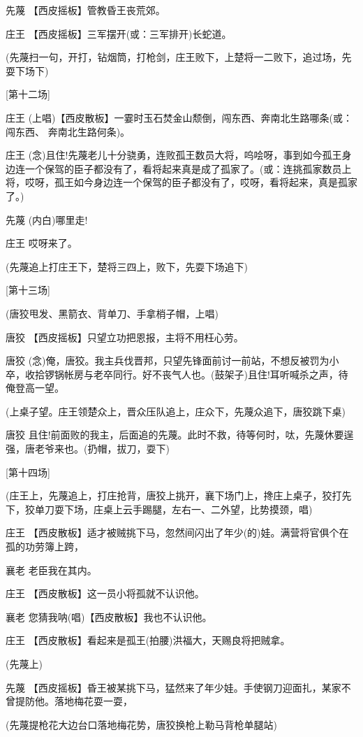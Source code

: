 先蔑 【西皮摇板】管教昏王丧荒郊。

庄王 【西皮摇板】三军摆开(或：三军排开)长蛇道。

(先蔑扫一句，开打，钻烟筒，打枪剑，庄王败下，上楚将一二败下，追过场，先耍下场下)

{[}第十二场{]}

庄王
(上唱)【西皮散板】一霎时玉石焚金山颓倒，闯东西、奔南北生路哪条(或：闯东西、
奔南北生路何条)。

庄王
(念)且住!先蔑老儿十分骁勇，连败孤王数员大将，呜哙呀，事到如今孤王身边连一个保驾的臣子都没有了，看将起来真是成了孤家了。(或：连挑孤家数员上将，哎呀，孤王如今身边连一个保驾的臣子都没有了，哎呀，看将起来，真是孤家了。)

先蔑 (内白)哪里走!

庄王 哎呀来了。

(先蔑追上打庄王下，楚将三四上，败下，先耍下场追下)

{[}第十三场{]}

(唐狡甩发、黑箭衣、背单刀、手拿梢子帽，上唱)

唐狡 【西皮摇板】只望立功把恩报，主将不用枉心劳。

唐狡
(念)俺，唐狡。我主兵伐晋邦，只望先锋面前讨一前站，不想反被罚为小卒，收拾锣锅帐房与老卒同行。好不丧气人也。(鼓架子)且住!耳听喊杀之声，待俺登高一望。

(上桌子望。庄王领楚众上，晋众压队追上，庄众下，先蔑众追下，唐狡跳下桌)

唐狡
且住!前面败的我主，后面追的先蔑。此时不救，待等何时，呔，先蔑休要逞强，唐老爷来也。(扔帽，拔刀，耍下)

{[}第十四场{]}

(庄王上，先蔑追上，打庄抢背，唐狡上挑开，襄下场门上，搀庄上桌子，狡打先下，狡单刀耍下场，庄桌上云手踢腿，左右一、二外望，比势摸颈，唱)

庄王
【西皮散板】适才被贼挑下马，忽然间闪出了年少(的)娃。满营将官俱个在孤的功劳簿上跨，

襄老 老臣我在其内。

庄王 【西皮散板】这一员小将孤就不认识他。

襄老 您猜我呐(唱)【西皮散板】我也不认识他。

庄王 【西皮散板】看起来是孤王(拍腰)洪福大，天赐良将把贼拿。

(先蔑上)

先蔑
【西皮摇板】昏王被某挑下马，猛然来了年少娃。手使钢刀迎面扎，某家不曾提防他。落地梅花耍一耍，

(先蔑提枪花大边台口落地梅花势，唐狡换枪上勒马背枪单腿站)

